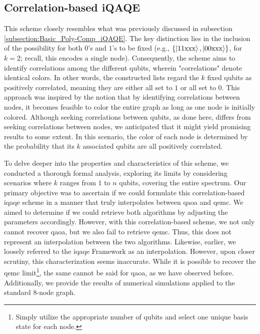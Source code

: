 






\subsection{Correlation-based iQAQE}
\label{subsection:Correlation_iQAQE}

This scheme closely resembles what was previously discussed in subsection \ref{subsection:Basic_Poly-Comp_iQAQE}. The key distinction lies in the inclusion of the possibility for both $0$'s and $1$'s to be fixed (e.g., $\{\ket{11\text{xxx}}, \ket{00\text{xxx}}\}$, for $k = 2$; recall, this encodes a single node). Consequently, the scheme aims to identify correlations among the different qubits, wherein "correlations" denote identical colors. In other words, the constructed lists regard the $k$ fixed qubits as positively correlated, meaning they are either all set to $1$ or all set to $0$. This approach was inspired by the notion that by identifying correlations between nodes, it becomes feasible to color the entire graph as long as one node is initially colored. Although seeking correlations between qubits, as done here, differs from seeking correlations between nodes, we anticipated that it might yield promising results to some extent. In this scenario, the color of each node is determined by the probability that its $k$ associated qubits are all positively correlated.

To delve deeper into the properties and characteristics of this scheme, we conducted a thorough formal analysis, exploring its limits by considering scenarios where $k$ ranges from $1$ to $n$ qubits, covering the entire spectrum. Our primary objective was to ascertain if we could formulate this correlation-based \acrshort{iqaqe} scheme in a manner that truly interpolates between \acrshort{qaoa} and \acrshort{qemc}. We aimed to determine if we could retrieve both algorithms by adjusting the parameters accordingly. However, with this correlation-based scheme, we not only cannot recover \acrshort{qaoa}, but we also fail to retrieve \acrshort{qemc}. Thus, this does not represent an interpolation between the two algorithms. Likewise, earlier, we loosely referred to the \acrshort{iqaqe} Framework as an interpolation. However, upon closer scrutiny, this characterization seems inaccurate. While it is possible to recover the \acrshort{qemc} limit\footnote{Simply utilize the appropriate number of qubits and select one unique basis state for each node.}, the same cannot be said for \acrshort{qaoa}, as we have observed before. Additionally, we provide the results of numerical simulations applied to the standard $8$-node graph.

